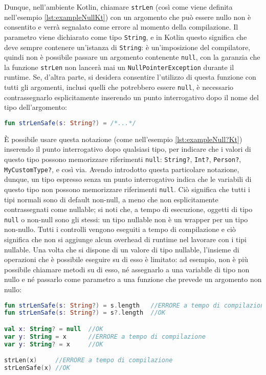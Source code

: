 Dunque, nell'ambiente Kotlin, chiamare \texttt{strLen} (così come viene definita nell'esempio \ref{lst:exampleNullKt}) con un argomento che può essere nullo non è consentito e verrà segnalato come errore al momento della compilazione. Il parametro viene dichiarato come tipo \texttt{String}, e in Kotlin questo significa che deve sempre contenere un'istanza di \texttt{String}: è un’imposizione del compilatore, quindi non è possibile passare un argomento contenente \texttt{null}, con la garanzia che la funzione \texttt{strLen} non lancerà mai un \texttt{NullPointerException} durante il runtime. Se, d'altra parte, si desidera consentire l'utilizzo di questa funzione con tutti gli argomenti, inclusi quelli che potrebbero essere \texttt{null}, è necessario contrassegnarlo esplicitamente inserendo un punto interrogativo dopo il nome del tipo dell'argomento:\\

\begin{lstlisting}[caption={Funzione Kotlin null-safe}, captionpos=b, label={lst:exampleNull?Kt}, language=Kotlin]
fun strLenSafe(s: String?) = /*...*/
\end{lstlisting}

È possibile usare questa notazione (come nell'esempio \ref{lst:exampleNull?Kt}) inserendo il punto interrogativo dopo qualsiasi tipo, per indicare che i valori di questo tipo possono memorizzare riferimenti \texttt{null}: \texttt{String?}, \texttt{Int?}, \texttt{Person?}, \texttt{MyCustomType?}, e così via. Avendo introdotto questa particolare notazione, dunque, un tipo espresso senza un punto interrogativo indica che le variabili di questo tipo non possono memorizzare riferimenti \texttt{null}. Ciò significa che tutti i tipi normali sono di default non-null, a meno che non esplicitamente contrassegnati come nullable; si noti che, a tempo di esecuzione, oggetti di tipo \texttt{null} o non-null sono gli stessi: un tipo nullable non è un wrapper per un tipo non-nullo. Tutti i controlli vengono eseguiti a tempo di compilazione e ciò significa che non si aggiunge alcun overhead di runtime nel lavorare con i tipi nullable. Una volta che si dispone di un valore di tipo nullable, l'insieme di operazioni che è possibile eseguire su di esso è limitato: ad esempio, non è più possibile chiamare metodi su di esso, né assegnarlo a una variabile di tipo non nullo e né passarlo come parametro a una funzione che prevede un argomento non nullo:\\

\begin{lstlisting}[caption={Alcuni utilizzi delle funzioni definite in precedenza}, captionpos=b, label={lst:exampleNullKtVari}, language=Kotlin]
fun strLenSafe(s: String?) = s.length   //ERRORE a tempo di compilazione
fun strLenSafe(s: String?) = s?.length  //OK

val x: String? = null  //OK
var y: String = x      //ERRORE a tempo di compilazione
var y: String? = x     //OK

strLen(x)     //ERRORE a tempo di compilazione
strLenSafe(x) //OK
\end{lstlisting}

